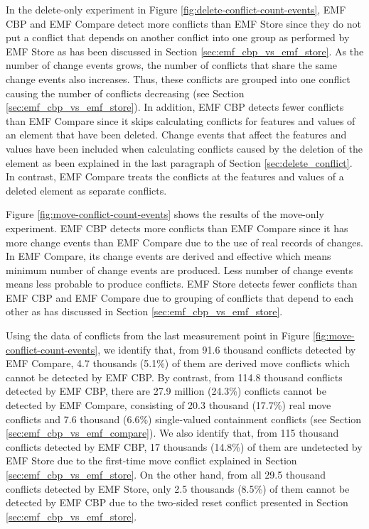 In the delete-only experiment in Figure \ref{fig:delete-conflict-count-events}, EMF CBP and EMF Compare detect more conflicts than EMF Store since they do not put a conflict that depends on another conflict into one group as performed by EMF Store as has been discussed in Section \ref{sec:emf_cbp_vs_emf_store}. As the number of change events grows, the number of conflicts that share the same change events also increases. Thus, these conflicts are grouped into one conflict causing the number of conflicts decreasing (see Section \ref{sec:emf_cbp_vs_emf_store}). In addition, EMF CBP detects fewer conflicts than EMF Compare since it skips calculating conflicts for features and values of an element that have been deleted. Change events that affect the features and values have been included when calculating conflicts caused by the deletion of the element as been explained in the last paragraph of Section \ref{sec:delete_conflict}. In contrast, EMF Compare treats the conflicts at the features and values of a deleted element as separate conflicts. 

Figure \ref{fig:move-conflict-count-events} shows the results of the move-only experiment. EMF CBP detects more conflicts than EMF Compare since it has more change events than EMF Compare due to the use of real records of changes. In EMF Compare, its change events are derived and effective which means minimum number of change events are produced. Less number of change events means less probable to produce conflicts. EMF Store detects fewer conflicts than EMF CBP and EMF Compare due to grouping of conflicts that depend to each other as has discussed in Section \ref{sec:emf_cbp_vs_emf_store}.

Using the data of conflicts from the last measurement point in Figure \ref{fig:move-conflict-count-events}, we identify that, from 91.6 thousand conflicts detected by EMF Compare, 4.7 thousands (5.1\%) of them are derived move conflicts which cannot be detected by EMF CBP. By contrast, from 114.8 thousand conflicts detected by EMF CBP, there are 27.9 million (24.3\%) conflicts cannot be detected by EMF Compare, consisting of 20.3 thousand (17.7\%) real move conflicts and 7.6 thousand (6.6\%) single-valued containment conflicts (see Section \ref{sec:emf_cbp_vs_emf_compare}). We also identify that, from 115 thousand conflicts detected by EMF CBP, 17 thousands (14.8\%) of them are undetected by EMF Store due to the first-time move conflict explained in Section \ref{sec:emf_cbp_vs_emf_store}. On the other hand, from all 29.5 thousand conflicts detected by EMF Store, only 2.5 thousands (8.5\%) of them cannot be detected by EMF CBP due to the two-sided reset conflict presented in Section \ref{sec:emf_cbp_vs_emf_store}.

